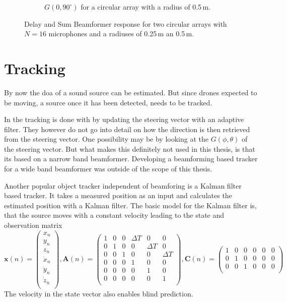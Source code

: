 \begin{figure}[h]
\begin{subfigure}[t]{0.45\textwidth}
		\caption{$G(0, 90^\circ)$ for a circular array with a radius of 0.5\,m.}
		\label{ssl:fig:f_dep1}
	\end{subfigure}
	\caption{Delay and Sum Beamformer response for two circular arrays with $N=16$ microphones
		and a radiuses of 0.25\,m an 0.5\,m. }
	\label{ssl:fig:f_deps}
\end{figure}
\section{Tracking}
By now the \acrshort{doa} of a sound source can be estimated.
But since drones expected to be moving, a source once it has been
detected, needs to be tracked.

In \cite{GuiAhmad} the tracking is done with by
updating the steering vector with an adaptive filter.
They however do not go into detail on how the direction is then
retrieved from the steering vector.
One possibility may be by looking at the $G(\phi, \theta)$ of the steering vector.
But what makes this definitely not used in this thesis, is that its based on a
narrow band beamformer.
Developing a beamforming based tracker for a wide band beamformer was outside of the
scope of this thesis.

Another popular object tracker independent of beamforing is a Kalman filter based tracker.
It takes a measured position as an input and calculates the estimated position with
a Kalman filter.
The basic model for the Kalman filter is, that the source moves with a constant velocity leading to
the state and observation matrix
\begin{equation*}
	\bm{x}(n) =
	\begin{pmatrix}
		x_n       \\
		y_n       \\
		z_n       \\
		\dot{x}_n \\
		\dot{y}_n \\
		\dot{z}_n \\
	\end{pmatrix},
	\bm{A}(n) =
	\begin{pmatrix}
		1 & 0 & 0 & \Delta T & 0        & 0        \\
		0 & 1 & 0 & 0        & \Delta T & 0        \\
		0 & 0 & 1 & 0        & 0        & \Delta T \\
		0 & 0 & 0 & 1        & 0        & 0        \\
		0 & 0 & 0 & 0        & 1        & 0        \\
		0 & 0 & 0 & 0        & 0        & 1        \\
	\end{pmatrix},
	\bm{C}(n) =
	\begin{pmatrix}
		1 & 0 & 0 & 0 & 0 & 0 \\
		0 & 1 & 0 & 0 & 0 & 0 \\
		0 & 0 & 1 & 0 & 0 & 0 \\
	\end{pmatrix}
\end{equation*}
The velocity in the state vector also enables blind prediction.

